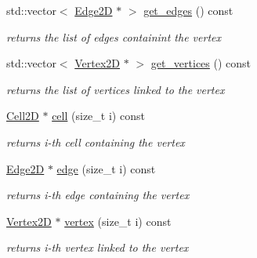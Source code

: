 \begin{DoxyCompactItemize}
std\+::vector$<$ \hyperlink{classHArDCore2D_1_1Edge2D}{Edge2D} $\ast$ $>$ \hyperlink{group__Mesh2D_ga652502483daf80fd18557f6a80e499ca}{get\+\_\+edges} () const
\begin{DoxyCompactList}\small\item\em returns the list of edges containint the vertex \end{DoxyCompactList}\item 
std\+::vector$<$ \hyperlink{classHArDCore2D_1_1Vertex2D}{Vertex2D} $\ast$ $>$ \hyperlink{group__Mesh2D_ga05a3eb80e579fce25ddd3f423adac1a4}{get\+\_\+vertices} () const
\begin{DoxyCompactList}\small\item\em returns the list of vertices linked to the vertex \end{DoxyCompactList}\item 
\mbox{\label{classHArDCore2D_1_1Vertex2D_ad5eb7914636eb9937f84370c6030aed9}} 
\hyperlink{classHArDCore2D_1_1Cell2D}{Cell2D} $\ast$ \hyperlink{classHArDCore2D_1_1Vertex2D_ad5eb7914636eb9937f84370c6030aed9}{cell} (size\+\_\+t i) const
\begin{DoxyCompactList}\small\item\em returns i-\/th cell containing the vertex \end{DoxyCompactList}\item 
\mbox{\label{classHArDCore2D_1_1Vertex2D_afebfae577ee499d5309ff6a3981279de}} 
\hyperlink{classHArDCore2D_1_1Edge2D}{Edge2D} $\ast$ \hyperlink{classHArDCore2D_1_1Vertex2D_afebfae577ee499d5309ff6a3981279de}{edge} (size\+\_\+t i) const
\begin{DoxyCompactList}\small\item\em returns i-\/th edge containing the vertex \end{DoxyCompactList}\item 
\mbox{\label{classHArDCore2D_1_1Vertex2D_a2094c42a5fe6dc9fa3b91cb90746eeb9}} 
\hyperlink{classHArDCore2D_1_1Vertex2D}{Vertex2D} $\ast$ \hyperlink{classHArDCore2D_1_1Vertex2D_a2094c42a5fe6dc9fa3b91cb90746eeb9}{vertex} (size\+\_\+t i) const
\begin{DoxyCompactList}\small\item\em returns i-\/th vertex linked to the vertex \end{DoxyCompactList}\item 

\end{DoxyCompactItemize}
